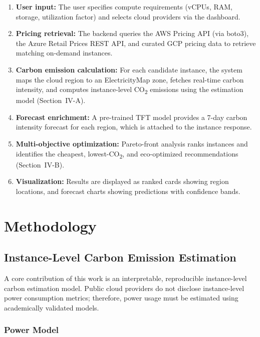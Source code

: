 \documentclass[12pt]{article}
\begin{document}
\begin{enumerate}
    \item \textbf{User input:} The user specifies compute requirements (vCPUs, RAM, storage, utilization factor) and selects cloud providers via the dashboard.
    \item \textbf{Pricing retrieval:} The backend queries the AWS Pricing API (via boto3), the Azure Retail Prices REST API, and curated GCP pricing data to retrieve matching on-demand instances.
    \item \textbf{Carbon emission calculation:} For each candidate instance, the system maps the cloud region to an ElectricityMap zone, fetches real-time carbon intensity, and computes instance-level CO\textsubscript{2} emissions using the estimation model (Section~IV-A).
    \item \textbf{Forecast enrichment:} A pre-trained TFT model provides a 7-day carbon intensity forecast for each region, which is attached to the instance response.
    \item \textbf{Multi-objective optimization:} Pareto-front analysis ranks instances and identifies the cheapest, lowest-CO\textsubscript{2}, and eco-optimized recommendations (Section~IV-B).
    \item \textbf{Visualization:} Results are displayed as ranked cards showing region locations, and forecast charts showing predictions with confidence bands.
\end{enumerate}

\section{Methodology}

\subsection{Instance-Level Carbon Emission Estimation}

A core contribution of this work is an interpretable, reproducible instance-level carbon estimation model. Public cloud providers do not disclose instance-level power consumption metrics; therefore, power usage must be estimated using academically validated models.

\subsubsection{Power Model}
\end{document}
